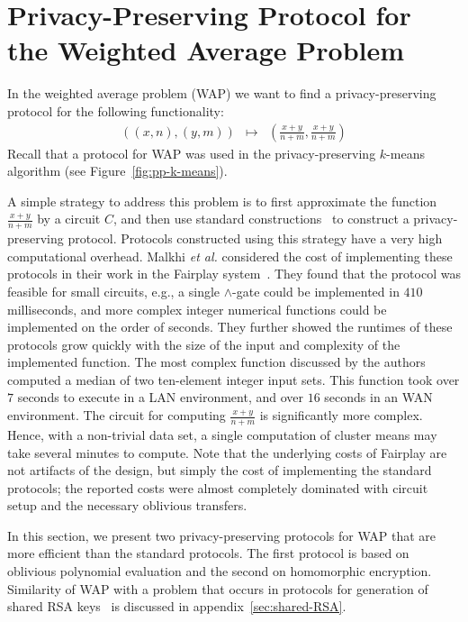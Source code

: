 \section{Privacy-Preserving Protocol for \\ the Weighted Average Problem}
\label{sec:WAP}

In the weighted average problem (WAP) we want to find
a privacy-preserving protocol for the following functionality:
\begin{eqnarray*}
((x,n),(y,m)) & \longmapsto & (\frac{x+y}{n+m}, \frac{x+y}{n+m})
\end{eqnarray*}
Recall that a protocol for WAP was used in
the privacy-preserving $k$-means algorithm (see Figure~\ref{fig:pp-k-means}).


A simple strategy to address this problem is to first approximate the
function $\frac{x+y}{n+m}$ by a circuit $C$, and then use standard
constructions~\cite{Goldreich87,Goldreich:JACM:91,Yao86} to construct
a privacy-preserving protocol.  Protocols constructed using this
strategy have a very high computational overhead. Malkhi {\it et al.} 
considered the cost of implementing these protocols in their work in
the Fairplay system~\cite{mnps04}.  They found that the protocol was
feasible for small circuits, e.g., a single $\wedge$-gate could be
implemented in $410$ milliseconds, and more complex integer numerical
functions could be implemented on the order of seconds.  They further
showed the runtimes of these protocols grow quickly with the size of
the input and complexity of the implemented function.  The most
complex function discussed by the authors computed a median of two
ten-element integer input sets.  This function took over $7$ seconds
to execute in a LAN environment, and over $16$ seconds in an WAN
environment.  The circuit for computing $\frac{x+y}{n+m}$ is
significantly more complex. Hence, with a non-trivial data set, a
single computation of cluster means may take several minutes to compute.  Note that
the underlying costs of Fairplay are not artifacts of the design, but
simply the cost of implementing the standard protocols; the reported
costs were almost completely dominated with circuit setup and the
necessary oblivious transfers.

In this section, we present two privacy-preserving protocols for WAP
that are more efficient than the standard protocols. The first
protocol is based on oblivious polynomial evaluation and the second on
homomorphic encryption. Similarity of WAP with a problem that occurs
in protocols for generation of shared RSA
keys~\cite{Boneh-Franklin-2001,Gilboa99} is discussed in
appendix~\ref{sec:shared-RSA}.


